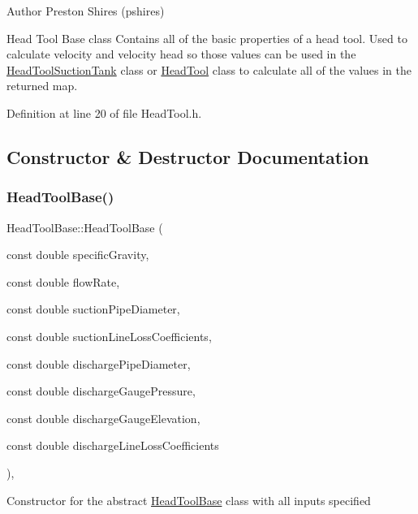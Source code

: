\begin{DoxyAuthor}{Author}
Preston Shires (pshires) 
\end{DoxyAuthor}
Head Tool Base class Contains all of the basic properties of a head tool. Used to calculate velocity and velocity head so those values can be used in the \hyperlink{class_head_tool_suction_tank}{Head\+Tool\+Suction\+Tank} class or \hyperlink{class_head_tool}{Head\+Tool} class to calculate all of the values in the returned map. 

Definition at line 20 of file Head\+Tool.\+h.



\subsection{Constructor \& Destructor Documentation}
\mbox{\label{class_head_tool_base_ae5bb2325e1266c64b16937d964aea14f}} 
\subsubsection{\texorpdfstring{Head\+Tool\+Base()}{HeadToolBase()}}
{\footnotesize\ttfamily Head\+Tool\+Base\+::\+Head\+Tool\+Base (\begin{DoxyParamCaption}\item[{const double}]{specific\+Gravity,  }\item[{const double}]{flow\+Rate,  }\item[{const double}]{suction\+Pipe\+Diameter,  }\item[{const double}]{suction\+Line\+Loss\+Coefficients,  }\item[{const double}]{discharge\+Pipe\+Diameter,  }\item[{const double}]{discharge\+Gauge\+Pressure,  }\item[{const double}]{discharge\+Gauge\+Elevation,  }\item[{const double}]{discharge\+Line\+Loss\+Coefficients }\end{DoxyParamCaption})\hspace{0.3cm}{\ttfamily [inline]}, {\ttfamily [protected]}}

Constructor for the abstract \hyperlink{class_head_tool_base}{Head\+Tool\+Base} class with all inputs specified



